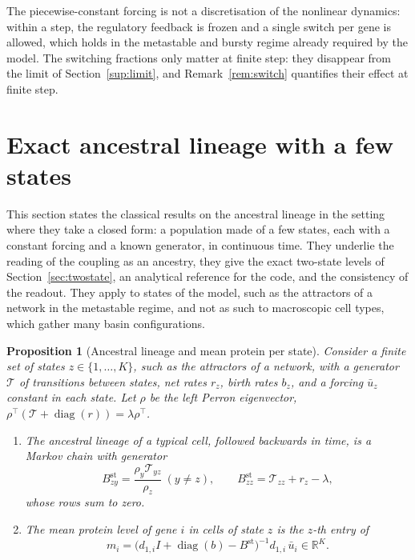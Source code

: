 \documentclass[a4paper, 11pt]{article}
\DeclareMathOperator{\diag}{diag}
\newcommand{\Tg}{\mathcal{T}}
\theoremstyle{plain}
\newtheorem{prop}{Proposition}
\theoremstyle{remark}
\begin{document}
The piecewise-constant forcing is not a discretisation of the nonlinear dynamics: within a step, the regulatory feedback is frozen and a single switch per gene is allowed, which holds in the metastable and bursty regime already required by the model. The switching fractions only matter at finite step: they disappear from the limit of Section~\ref{sup:limit}, and Remark~\ref{rem:switch} quantifies their effect at finite step.

\section{Exact ancestral lineage with a few states}\label{sup:ancestral}

This section states the classical results on the ancestral lineage in the setting where they take a closed form: a population made of a few states, each with a constant forcing and a known generator, in continuous time. They underlie the reading of the coupling as an ancestry, they give the exact two-state levels of Section~\ref{sec:twostate}, an analytical reference for the code, and the consistency of the readout. They apply to states of the model, such as the attractors of a network in the metastable regime, and not as such to macroscopic cell types, which gather many basin configurations.

\begin{prop}[Ancestral lineage and mean protein per state]\label{prop:ancestral}
Consider a finite set of states $z \in \{1,\dots,K\}$, such as the attractors of a network, with a generator $\Tg$ of transitions between states, net rates $r_z$, birth rates $b_z$, and a forcing $\bar u_z$ constant in each state. Let $\rho$ be the left Perron eigenvector, $\rho^\top(\Tg + \diag(r)) = \lambda \rho^\top$.
\begin{enumerate}[label=(\roman*)]
\item The ancestral lineage of a typical cell, followed backwards in time, is a Markov chain with generator
\begin{equation}\label{eq:B}
B^{\mathrm{st}}_{zy} = \frac{\rho_y \Tg_{yz}}{\rho_z}\ (y \neq z), \qquad B^{\mathrm{st}}_{zz} = \Tg_{zz} + r_z - \lambda,
\end{equation}
whose rows sum to zero.
\item The mean protein level of gene $i$ in cells of state $z$ is the $z$-th entry of
\begin{equation}\label{eq:resolvent}
m_i = \bigl(d_{1,i} I + \diag(b) - B^{\mathrm{st}}\bigr)^{-1} d_{1,i}\,\bar u_i \in \mathbb{R}^K .
\end{equation}
\end{enumerate}
\end{prop}
\end{document}
